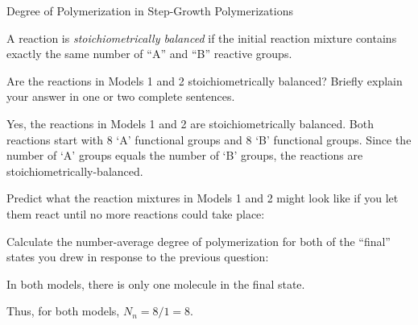 \begin{activity}{Degree of Polymerization in Step-Growth Polymerizations}
\begin{ctqs}
\end{ctqs}
	
\begin{infobox}

A reaction is \emph{stoichiometrically balanced} if the initial reaction mixture contains exactly the same number of ``A'' and ``B'' reactive groups.

\end{infobox}
	
\begin{ctqs}
		\question Are the reactions in Models 1 and 2 stoichiometrically balanced?  Briefly explain your answer in one or two complete sentences.
		
		\begin{solution}[1in]
			Yes, the reactions in Models 1 and 2 are stoichiometrically balanced.  Both reactions start with 8 `A' functional groups and 8 `B' functional groups.  Since the number of `A' groups equals the number of `B' groups, the reactions are stoichiometrically-balanced.
		\end{solution}
		
		\question Predict what the reaction mixtures in Models 1 and 2 might look like if you let them react until no more reactions could take place:
		
	\begin{solution}[2in]
	
	\end{solution}
		
		\question Calculate the number-average degree of polymerization for both of the ``final'' states you drew in response to the previous question:
		
		\begin{solution}[1in]
			In both models, there is only one molecule in the final state.
			
			Thus, for both models, $N_n = 8/1 = 8$.
		\end{solution}
\end{ctqs}


\end{activity}
